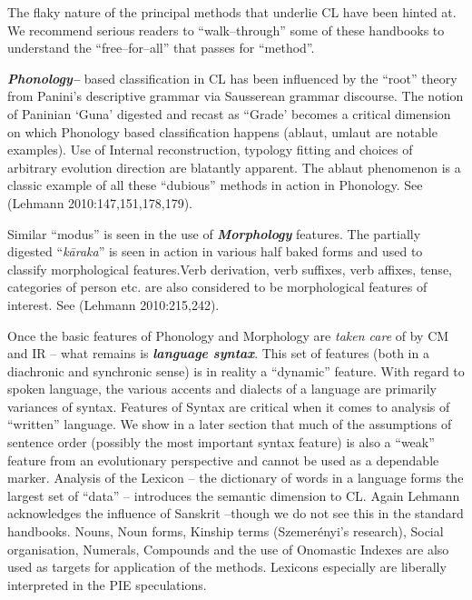 The flaky nature of the principal methods that underlie CL have been hinted at. We recommend serious readers to “walk–through” some of these handbooks to understand the “free–for–all” that passes for “method”.

\textbf{\textit{Phonology–}} based classification in CL has been influenced by the “root” theory from Panini’s descriptive grammar via Sausserean grammar discourse. The notion of Paninian ‘Guna’ digested and recast as “Grade’ becomes a critical dimension on which Phonology based classification happens (ablaut, umlaut are notable examples). Use of Internal reconstruction, typology fitting and choices of arbitrary evolution direction are blatantly apparent. The ablaut phenomenon is a classic example of all these “dubious” methods in action in Phonology. See (Lehmann 2010:147,151,178,179).

Similar “modus” is seen in the use of \textbf{\textit{Morphology}} features. The partially digested “\textit{kāraka}” is seen in action in various half baked forms and used to classify morphological features.Verb derivation, verb suffixes, verb affixes, tense, categories of person etc. are also considered to be morphological features of interest. See (Lehmann 2010:215,242).

Once the basic features of Phonology and Morphology are \textit{taken care} of by CM and IR – what remains is \textbf{\textit{language syntax}}. This set of features (both in a diachronic and synchronic sense) is in reality a “dynamic” feature. With regard to spoken language, the various accents and dialects of a language are primarily variances of syntax. Features of Syntax are critical when it comes to analysis of “written” language. We show in a later section that much of the assumptions of sentence order (possibly the most important syntax feature) is also a “weak” feature from an evolutionary perspective and cannot be used as a dependable marker. Analysis of the Lexicon – the dictionary of words in a language forms the largest set of “data” – introduces the semantic dimension to CL. Again Lehmann acknowledges the influence of Sanskrit –though we do not see this in the standard handbooks. Nouns, Noun forms, Kinship terms (Szemerényi’s research), Social organisation, Numerals, Compounds and the use of Onomastic Indexes are also used as targets for application of the methods. Lexicons especially are liberally interpreted in the PIE speculations.

